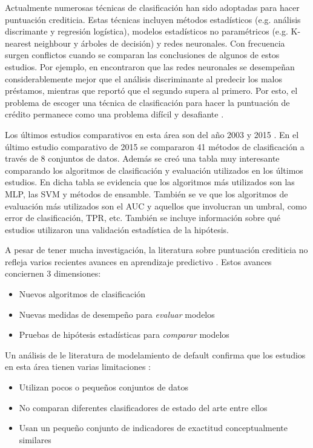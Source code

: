 Actualmente numerosas técnicas de clasificación han sido adoptadas para hacer puntuación crediticia. Estas técnicas incluyen métodos estadísticos (e.g. análisis discrimante y regresión logística), modelos estadísticos no paramétricos (e.g. K-nearest neighbour y árboles de decisión) y redes neuronales. Con frecuencia surgen conflictos cuando se comparan las conclusiones de algunos de estos estudios. Por ejemplo, en \cite{desai1996comparison} encontraron que las redes neuronales se desempeñan considerablemente mejor que el análisis discriminante al predecir los malos préstamos, mientras que \cite{yobas2000credit} reportó que el segundo supera al primero. Por esto, el problema de escoger una técnica de clasificación para hacer la puntuación de crédito permanece como una problema difícil y desafiante \cite{baesens2003benchmarking}.

Los últimos estudios comparativos en esta área son del año 2003 \cite{baesens2003benchmarking} y 2015 \cite{lessmann2015benchmarking}. En el último estudio comparativo de 2015 se compararon 41 métodos de clasificación a través de 8 conjuntos de datos. Además se creó una tabla muy interesante comparando los algoritmos de clasificación y evaluación utilizados en los últimos estudios. En dicha tabla se evidencia que los algoritmos más utilizados son las \ac{MLP}, las \ac{SVM} y métodos de ensamble. También se ve que los algoritmos de evaluación más utilizados son el \ac{AUC} y aquellos que involucran un umbral, como error de clasificación, \ac{TPR}, etc. También se incluye información sobre qué estudios utilizaron una validación estadística de la hipótesis.

A pesar de tener mucha investigación, la literatura sobre puntuación crediticia no refleja varios recientes avances en aprendizaje predictivo \cite{lessmann2015benchmarking}. Estos avances conciernen 3 dimensiones:

\begin{itemize}
    \item Nuevos algoritmos de clasificación
    \item Nuevas medidas de desempeño para \textit{evaluar} modelos
    \item Pruebas de hipótesis estadísticas para \textit{comparar} modelos 
\end{itemize}

Un análisis de le literatura de modelamiento de default confirma que los estudios en esta área tienen varias limitaciones \cite{lessmann2015benchmarking}:

\begin{itemize}
    \item Utilizan pocos o pequeños conjuntos de datos
    \item No comparan diferentes clasificadores de estado del arte entre ellos
    \item Usan un pequeño conjunto de indicadores de exactitud conceptualmente similares
\end{itemize}

